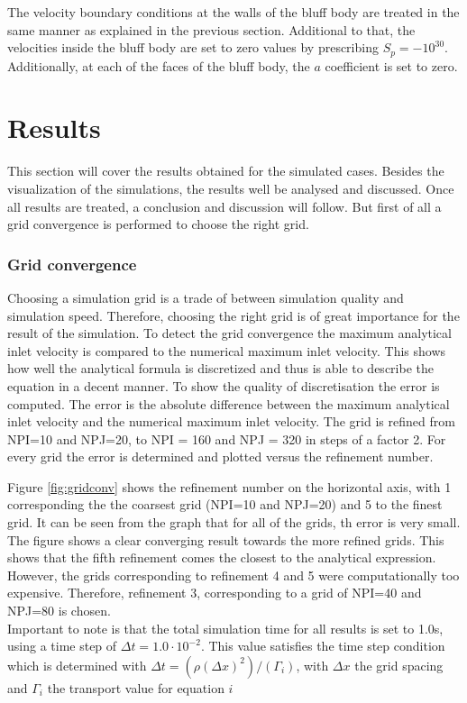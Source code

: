 \documentclass{CFD2017}
\begin{document}
The velocity boundary conditions at the walls of the bluff body are treated in the same manner as explained in the previous section. Additional to that, the velocities inside the bluff body are set to zero values by prescribing $S_p=-10^{30}$. Additionally, at each of the faces of the bluff body, the $a$ coefficient is set to zero. \\


\section{Results}
This section will cover the results obtained for the simulated cases. Besides the visualization of the simulations, the results well be analysed and discussed. Once all results are treated, a conclusion and discussion will follow. But first of all a grid convergence is performed to choose the right grid.\\
\subsubsection{Grid convergence}
Choosing a simulation grid is a trade of between simulation quality and simulation speed. Therefore, choosing the right grid is of great importance for the result of the simulation. To detect the grid convergence the maximum analytical inlet velocity is compared to the numerical maximum inlet velocity. This shows how well the analytical formula is discretized and thus is able to describe the equation in a decent manner. To show the quality of discretisation the error is computed. The error is the absolute difference between the maximum analytical inlet velocity and the numerical maximum inlet velocity. The grid is refined from NPI=10 and NPJ=20, to NPI = 160 and NPJ = 320 in steps of a factor 2. For every grid the error is determined and plotted versus the refinement number.


Figure \ref{fig:gridconv} shows the refinement number on the horizontal axis, with 1 corresponding the the coarsest grid (NPI=10 and NPJ=20) and 5 to the finest grid. It can be seen from the graph that for all of the grids, th error is very small. The figure shows a clear converging result towards the more refined grids. This shows that the fifth refinement comes the closest to the analytical expression. However, the grids corresponding to refinement 4 and 5 were computationally too expensive. Therefore, refinement 3, corresponding to a grid of NPI=40 and NPJ=80 is chosen.\\
Important to note is that the total simulation time for all results is set to 1.0s, using a time step of $\Delta t=1.0 \cdot 10^{-2}$. This value satisfies the time step condition which is determined with $\Delta t = (\rho (\Delta x)^2)/(\Gamma_i)$, with $\Delta x$ the grid spacing and $\Gamma_i$ the transport value for equation $i$
\end{document}
